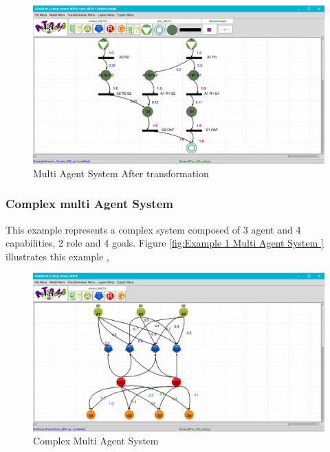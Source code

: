 \begin{figure}[th]
	\centering
 	\includegraphics[scale=0.3]{ch3/img/ex1pns}
	\caption{\label{fig:Multi Agent System After transformation }Multi Agent System After transformation}
\end{figure} 



\pagebreak
\subsubsection{ Complex multi Agent System }
This example represents a complex system composed of 3 agent and 4 capabilities, 2 role and 4 goals. Figure \ref{fig:Example 1 Multi Agent System } illustrates this example ,
 


\begin{figure}[th]
	\centering
 	\includegraphics[scale=0.3]{ch3/img/article}
	\caption{\label{fig:Complex Multi Agent System}Complex Multi Agent System}
\end{figure} 

